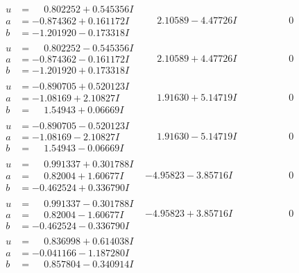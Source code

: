 \documentclass[1p]{elsarticle_modified}
\theoremstyle{definition}
\begin{document}
$$\begin{array}{c|c|c}
\begin{aligned}
u &= \phantom{-}0.802252 + 0.545356 I \\
a &= -0.874362 + 0.161172 I \\
b &= -1.201920 - 0.173318 I\end{aligned}
 & \phantom{-}2.10589 - 4.47726 I & \phantom{-0.000000 } 0 \\ \hline\begin{aligned}
u &= \phantom{-}0.802252 - 0.545356 I \\
a &= -0.874362 - 0.161172 I \\
b &= -1.201920 + 0.173318 I\end{aligned}
 & \phantom{-}2.10589 + 4.47726 I & \phantom{-0.000000 } 0 \\ \hline\begin{aligned}
u &= -0.890705 + 0.520123 I \\
a &= -1.08169 + 2.10827 I \\
b &= \phantom{-}1.54943 + 0.06669 I\end{aligned}
 & \phantom{-}1.91630 + 5.14719 I & \phantom{-0.000000 } 0 \\ \hline\begin{aligned}
u &= -0.890705 - 0.520123 I \\
a &= -1.08169 - 2.10827 I \\
b &= \phantom{-}1.54943 - 0.06669 I\end{aligned}
 & \phantom{-}1.91630 - 5.14719 I & \phantom{-0.000000 } 0 \\ \hline\begin{aligned}
u &= \phantom{-}0.991337 + 0.301788 I \\
a &= \phantom{-}0.82004 + 1.60677 I \\
b &= -0.462524 + 0.336790 I\end{aligned}
 & -4.95823 - 3.85716 I & \phantom{-0.000000 } 0 \\ \hline\begin{aligned}
u &= \phantom{-}0.991337 - 0.301788 I \\
a &= \phantom{-}0.82004 - 1.60677 I \\
b &= -0.462524 - 0.336790 I\end{aligned}
 & -4.95823 + 3.85716 I & \phantom{-0.000000 } 0 \\ \hline\begin{aligned}
u &= \phantom{-}0.836998 + 0.614038 I \\
a &= -0.041166 - 1.187280 I \\
b &= \phantom{-}0.857804 - 0.340914 I\end{aligned}

\end{array}$$
\end{document}
